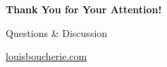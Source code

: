 \documentclass[aspectratio=169,xcolor=dvipsnames,10pt]{beamer}
\begin{document}




\begin{frame}
    \Huge{\centerline{\textbf{Thank You for Your Attention!}}}
    \vspace{1em}
    \Large{\centerline{Questions \& Discussion}}
    \vspace{1em}
    \centerline{\url{louisboucherie.com}}
    
\end{frame}

\end{document}
